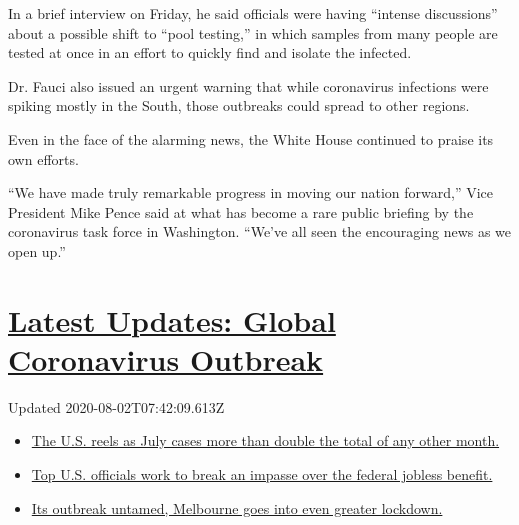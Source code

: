 In a brief interview on Friday, he said officials were having ``intense
discussions'' about a possible shift to ``pool testing,'' in which
samples from many people are tested at once in an effort to quickly find
and isolate the infected.

Dr. Fauci also issued an urgent warning that while coronavirus
infections were spiking mostly in the South, those outbreaks could
spread to other regions.

Even in the face of the alarming news, the White House continued to
praise its own efforts.

``We have made truly remarkable progress in moving our nation forward,''
Vice President Mike Pence said at what has become a rare public briefing
by the coronavirus task force in Washington. ``We've all seen the
encouraging news as we open up.''

\hypertarget{latest-updates-global-coronavirus-outbreak}{%
\section{\texorpdfstring{\href{https://www.nytimes.com/2020/08/01/world/coronavirus-covid-19.html?action=click\&pgtype=Article\&state=default\&region=MAIN_CONTENT_1\&context=storylines_live_updates}{Latest
Updates: Global Coronavirus
Outbreak}}{Latest Updates: Global Coronavirus Outbreak}}\label{latest-updates-global-coronavirus-outbreak}}

Updated 2020-08-02T07:42:09.613Z

\begin{itemize}
\tightlist
\item
  \href{https://www.nytimes.com/2020/08/01/world/coronavirus-covid-19.html?action=click\&pgtype=Article\&state=default\&region=MAIN_CONTENT_1\&context=storylines_live_updates\#link-34047410}{The
  U.S. reels as July cases more than double the total of any other
  month.}
\item
  \href{https://www.nytimes.com/2020/08/01/world/coronavirus-covid-19.html?action=click\&pgtype=Article\&state=default\&region=MAIN_CONTENT_1\&context=storylines_live_updates\#link-780ec966}{Top
  U.S. officials work to break an impasse over the federal jobless
  benefit.}
\item
  \href{https://www.nytimes.com/2020/08/01/world/coronavirus-covid-19.html?action=click\&pgtype=Article\&state=default\&region=MAIN_CONTENT_1\&context=storylines_live_updates\#link-2bc8948}{Its
  outbreak untamed, Melbourne goes into even greater lockdown.}
\end{itemize}

